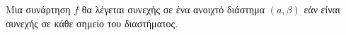 Μια συνάρτηση $ f $ θα λέγεται συνεχής σε ένα ανοιχτό διάστημα $ (a,\beta) $ εάν είναι συνεχής σε κάθε σημείο του διαστήματος.
